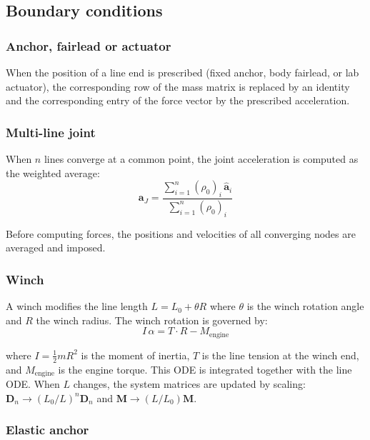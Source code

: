 \documentclass[11pt]{article}
\begin{document}
\subsection{Boundary conditions}

\subsubsection{Anchor, fairlead or actuator}

When the position of a line end is prescribed (fixed anchor, body fairlead, or lab actuator), the corresponding row of the mass matrix is replaced by an identity and the corresponding entry of the force vector by the prescribed acceleration.

\subsubsection{Multi-line joint}

When $n$ lines converge at a common point, the joint acceleration is computed as the weighted average:
\begin{equation}
\mathbf{a}_J = \frac{\sum_{i=1}^n(\rho_0)_i\,\hat{\mathbf{a}}_i}{\sum_{i=1}^n(\rho_0)_i}
\end{equation}

Before computing forces, the positions and velocities of all converging nodes are averaged and imposed.

\subsubsection{Winch}

A winch modifies the line length $L = L_0 + \theta R$ where $\theta$ is the winch rotation angle and $R$ the winch radius. The winch rotation is governed by:
\begin{equation}
I\,\alpha = T\cdot R - M_{\text{engine}}
\end{equation}

where $I = \tfrac{1}{2}m R^2$ is the moment of inertia, $T$ is the line tension at the winch end, and $M_{\text{engine}}$ is the engine torque. This ODE is integrated together with the line ODE. When $L$ changes, the system matrices are updated by scaling: $\mathbf{D}_n \to (L_0/L)^n\mathbf{D}_n$ and $\mathbf{M}\to(L/L_0)\mathbf{M}$.

\subsubsection{Elastic anchor}
\end{document}
